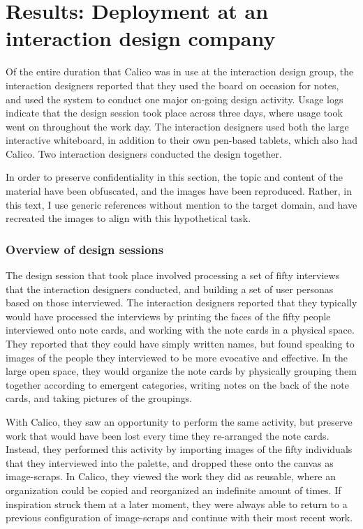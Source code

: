 \section{Results: Deployment at an interaction design company}
\label{chapter:evaluation:deployment2}

Of the entire duration that Calico was in use at the interaction design group, the interaction designers reported that they used the board on occasion for notes, and used the system to conduct one major on-going design activity. Usage logs indicate that the design session took place across three days, where usage took went on throughout the work day. The interaction designers used both the large interactive whiteboard, in addition to their own pen-based tablets, which also had Calico. Two interaction designers conducted the design together.

In order to preserve confidentiality in this section, the topic and content of the material have been obfuscated, and the images have been reproduced. Rather, in this text, I use generic references without mention to the target domain, and have recreated the images to align with this hypothetical task.

\subsubsection{Overview of design sessions}

The design session that took place involved processing a set of fifty interviews that the interaction designers conducted, and building a set of user personas based on those interviewed. The interaction designers reported that they typically would have processed the interviews by printing the faces of the fifty people interviewed onto note cards, and working with the note cards in a physical space. They reported that they could have simply written names, but found speaking to images of the people they interviewed to be more evocative and effective. In the large open space, they would organize the note cards by physically grouping them together according to emergent categories, writing notes on the back of the note cards, and taking pictures of the groupings. 

With Calico, they saw an opportunity to perform the same activity, but preserve work that would have been lost every time they re-arranged the note cards. Instead, they performed this activity by importing images of the fifty individuals that they interviewed into the palette, and dropped these onto the canvas as image-scraps. In Calico, they viewed the work they did as reusable, where an organization could be copied and reorganized an indefinite amount of times. If inspiration struck them at a later moment, they were always able to return to a previous configuration of image-scraps and continue with their most recent work.

